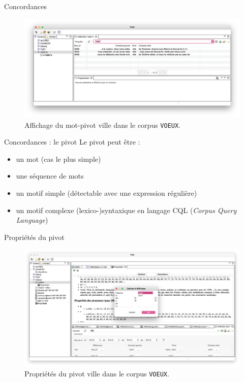 \documentclass[xetex,xcolor={table,usenames,dvipsnames}]{beamer}
\begin{document}
\begin{frame}{Concordances}
		\begin{figure}[h] %
		\centering
		\includegraphics[width=1\linewidth]{img/ville.png}
		\caption{Affichage du mot-pivot \og{}ville\fg{} dans le corpus \texttt{VOEUX}.}
		\label{fig:ling_out_TAL}
	\end{figure}
\end{frame}

\begin{frame}{Concordances : le pivot}
Le pivot peut être :
\begin{itemize}
	\item un mot (cas le plus simple)
	\item une séquence de mots
	\item un motif simple (détectable avec une expression régulière)
	\item un motif complexe (lexico-)syntaxique en langage \textsc{CQL} (\textit{Corpus Query Language})
\end{itemize}

\end{frame}

\begin{frame}{Propriétés du pivot}
	\begin{figure}[h] %
		\centering
		\includegraphics[width=1\linewidth]{img/proprietes_pivot.png}
		\caption{Propriétés du pivot \og{}ville\fg{} dans le corpus \texttt{VOEUX}.}
		\label{fig:ling_out_TAL}
	\end{figure}
\end{frame}
\end{document}
